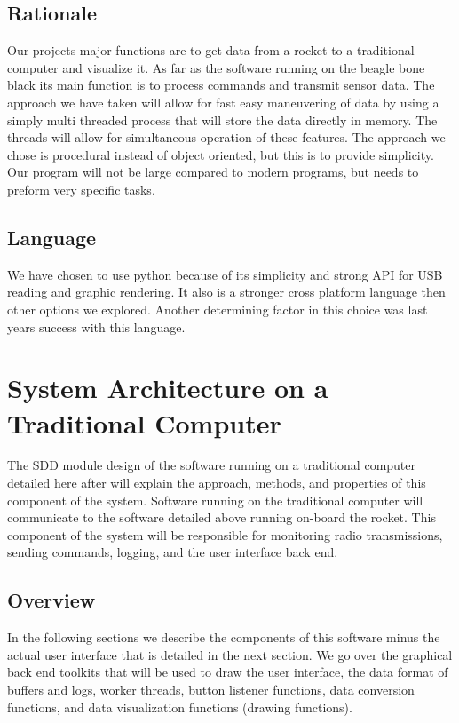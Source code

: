 \documentclass[10pt,draftclsnofoot,onecolumn,compsoc]{IEEEtran}
\begin{document}
\subsection{Rationale}
Our projects major functions are to get data from a rocket to a traditional computer and visualize it. As far as the software running on the beagle bone black its main function is to process commands and transmit sensor data. The approach we have taken will allow for fast easy maneuvering of data by using a simply multi threaded process that will store the data directly in memory. The threads will allow for simultaneous operation of these features. The approach we chose is procedural instead of object oriented, but this is to provide simplicity. Our program will not be large compared to modern programs, but needs to preform very specific tasks.
\subsection{Language}
We have chosen to use python because of its simplicity and strong API for USB reading and graphic rendering. It also is a stronger cross platform language then other options we explored. Another determining factor in this choice was last years success with this language.

\section{System Architecture on a Traditional Computer }
The SDD module design of the software running on a traditional computer detailed here after will explain the approach, methods, and properties of this component of the system. Software running on the traditional computer will communicate to the software detailed above running on-board the rocket. This component of the system will be responsible for monitoring radio transmissions, sending commands, logging, and the user interface back end. \par

\subsection{Overview}
In the following sections we describe the components of this software minus the actual user interface that is detailed in the next section. We go over the graphical back end toolkits that will be used to draw the user interface, the data format of buffers and logs, worker threads, button listener functions, data conversion functions, and data visualization functions (drawing functions). \par
\end{document}
